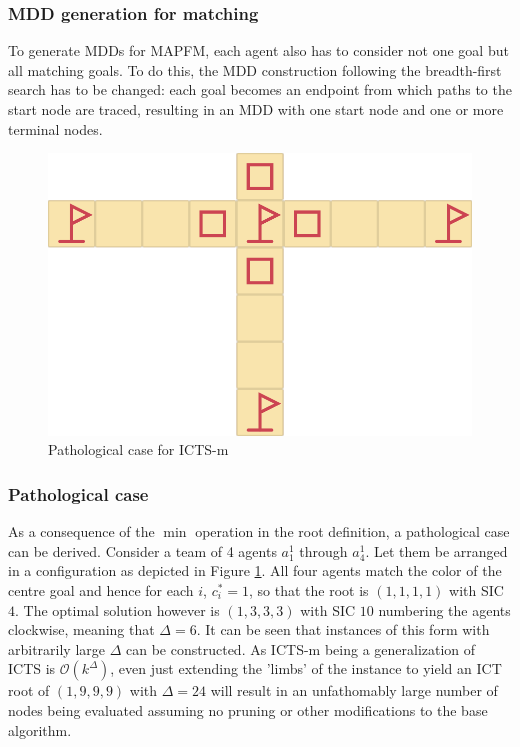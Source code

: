 \documentclass[english]{article}
\begin{document}
	\subsubsection{MDD generation for matching}
	To generate MDDs for MAPFM, each agent also has to consider not one goal but all matching goals. To do this, the MDD construction following the breadth-first search has to be changed: each goal becomes an endpoint from which paths to the start node are traced, resulting in an MDD with one start node and one or more terminal nodes.
	\begin{figure}
		\centering
		\includegraphics[width=\linewidth]{img/path}
		\caption{Pathological case for ICTS-m}
		\label{fig:path}
	\end{figure}
	\subsubsection{Pathological case}
	\label{pathology}
	As a consequence of the $\min$ operation in the root definition, a pathological case can be derived. Consider a team of 4 agents $a_1^1$ through $a_4^1$. Let them be arranged in a configuration as depicted in Figure \ref{fig:path}. All four agents match the color of the centre goal and hence for each $i$, $c^*_i = 1$, so that the root is $(1,1,1,1)$ with SIC $4$. The optimal solution however is $(1,3,3,3)$ with SIC $10$ numbering the agents clockwise, meaning that $\Delta = 6$. It can be seen that instances of this form with arbitrarily large $\Delta$ can be constructed. As ICTS-m being a generalization of ICTS is $\mathcal{O}(k^\Delta)$, even just extending the 'limbs' of the instance to yield an ICT root of $(1,9,9,9)$ with $\Delta = 24$ will result in an unfathomably large number of nodes being evaluated assuming no pruning or other modifications to the base algorithm.
	
\end{document}
